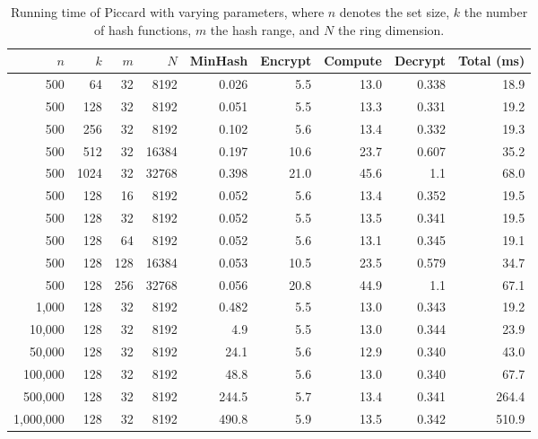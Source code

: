 \begin{table}[t]
\centering
\caption{Running time of Piccard with varying parameters, where $n$ denotes the set size, $k$ the number of hash functions, $m$ the hash range, and $N$ the ring dimension.}
\label{tab:piccard-params}
\begin{tabular}{rrrrrrrrr}
\toprule
$n$ & $k$ & $m$ & $N$ & MinHash & Encrypt & Compute & Decrypt & Total (ms) \\
\midrule
500 & 64 & 32 & 8192 & 0.026 & 5.5 & 13.0 & 0.338 & 18.9 \\
500 & 128 & 32 & 8192 & 0.051 & 5.5 & 13.3 & 0.331 & 19.2 \\
500 & 256 & 32 & 8192 & 0.102 & 5.6 & 13.4 & 0.332 & 19.3 \\
500 & 512 & 32 & 16384 & 0.197 & 10.6 & 23.7 & 0.607 & 35.2 \\
500 & 1024 & 32 & 32768 & 0.398 & 21.0 & 45.6 & 1.1 & 68.0 \\
500 & 128 & 16 & 8192 & 0.052 & 5.6 & 13.4 & 0.352 & 19.5 \\
500 & 128 & 32 & 8192 & 0.052 & 5.5 & 13.5 & 0.341 & 19.5 \\
500 & 128 & 64 & 8192 & 0.052 & 5.6 & 13.1 & 0.345 & 19.1 \\
500 & 128 & 128 & 16384 & 0.053 & 10.5 & 23.5 & 0.579 & 34.7 \\
500 & 128 & 256 & 32768 & 0.056 & 20.8 & 44.9 & 1.1 & 67.1 \\
1,000 & 128 & 32 & 8192 & 0.482 & 5.5 & 13.0 & 0.343 & 19.2 \\
10,000 & 128 & 32 & 8192 & 4.9 & 5.5 & 13.0 & 0.344 & 23.9 \\
50,000 & 128 & 32 & 8192 & 24.1 & 5.6 & 12.9 & 0.340 & 43.0 \\
100,000 & 128 & 32 & 8192 & 48.8 & 5.6 & 13.0 & 0.340 & 67.7 \\
500,000 & 128 & 32 & 8192 & 244.5 & 5.7 & 13.4 & 0.341 & 264.4 \\
1,000,000 & 128 & 32 & 8192 & 490.8 & 5.9 & 13.5 & 0.342 & 510.9 \\
\bottomrule
\end{tabular}
\end{table}


